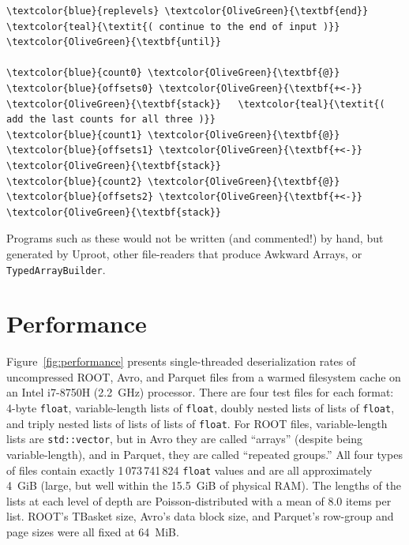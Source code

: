 \documentclass{webofc}
\begin{document}
\begin{Verbatim}[commandchars=\\\{\}]
  \textcolor{blue}{replevels} \textcolor{OliveGreen}{\textbf{end}}               \textcolor{teal}{\textit{( continue to the end of input )}}
\textcolor{OliveGreen}{\textbf{until}}

\textcolor{blue}{count0} \textcolor{OliveGreen}{\textbf{@}} \textcolor{blue}{offsets0} \textcolor{OliveGreen}{\textbf{+<-}} \textcolor{OliveGreen}{\textbf{stack}}   \textcolor{teal}{\textit{( add the last counts for all three )}}
\textcolor{blue}{count1} \textcolor{OliveGreen}{\textbf{@}} \textcolor{blue}{offsets1} \textcolor{OliveGreen}{\textbf{+<-}} \textcolor{OliveGreen}{\textbf{stack}}
\textcolor{blue}{count2} \textcolor{OliveGreen}{\textbf{@}} \textcolor{blue}{offsets2} \textcolor{OliveGreen}{\textbf{+<-}} \textcolor{OliveGreen}{\textbf{stack}}
\end{Verbatim}

Programs such as these would not be written (and commented!) by hand, but generated by Uproot, other file-readers that produce Awkward Arrays, or \texttt{TypedArrayBuilder}.

\section{Performance}
\label{sec:performance}

Figure~\ref{fig:performance} presents single-threaded deserialization rates of uncompressed ROOT, Avro, and Parquet files from a warmed filesystem cache on an Intel i7-8750H (2.2~GHz) processor. There are four test files for each format: 4-byte \texttt{float}, variable-length lists of \texttt{float}, doubly nested lists of lists of \texttt{float}, and triply nested lists of lists of lists of \texttt{float}. For ROOT files, variable-length lists are \texttt{std::vector}, but in Avro they are called ``arrays'' (despite being variable-length), and in Parquet, they are called ``repeated groups.'' All four types of files contain exactly 1\,073\,741\,824 \texttt{float} values and are all approximately 4~GiB (large, but well within the 15.5~GiB of physical RAM). The lengths of the lists at each level of depth are Poisson-distributed with a mean of 8.0 items per list. ROOT's TBasket size, Avro's data block size, and Parquet's row-group and page sizes were all fixed at 64~MiB.
\end{document}
